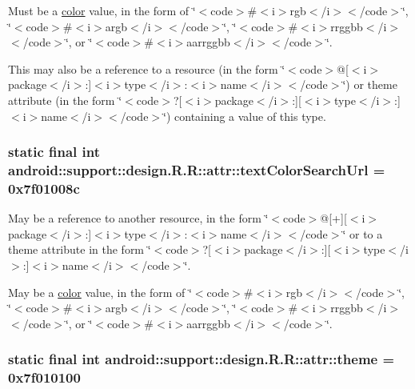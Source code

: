 Must be a \hyperlink{classandroid_1_1support_1_1design_1_1_r_1_1color}{color} value, in the form of \char`\"{}$<$code$>$\#$<$i$>$rgb$<$/i$>$$<$/code$>$\char`\"{}, \char`\"{}$<$code$>$\#$<$i$>$argb$<$/i$>$$<$/code$>$\char`\"{}, \char`\"{}$<$code$>$\#$<$i$>$rrggbb$<$/i$>$$<$/code$>$\char`\"{}, or \char`\"{}$<$code$>$\#$<$i$>$aarrggbb$<$/i$>$$<$/code$>$\char`\"{}. 

This may also be a reference to a resource (in the form \char`\"{}$<$code$>$@\mbox{[}$<$i$>$package$<$/i$>$:\mbox{]}$<$i$>$type$<$/i$>$:$<$i$>$name$<$/i$>$$<$/code$>$\char`\"{}) or theme attribute (in the form \char`\"{}$<$code$>$?\mbox{[}$<$i$>$package$<$/i$>$:\mbox{]}\mbox{[}$<$i$>$type$<$/i$>$:\mbox{]}$<$i$>$name$<$/i$>$$<$/code$>$\char`\"{}) containing a value of this type. \hypertarget{classandroid_1_1support_1_1design_1_1_r_1_1attr_c075dcd0349f5fa189e8b23ac0cbfe4b}{
\subsubsection[{textColorSearchUrl}]{\setlength{\rightskip}{0pt plus 5cm}static final int android::support::design.R.R::attr::textColorSearchUrl = 0x7f01008c}}
\label{classandroid_1_1support_1_1design_1_1_r_1_1attr_c075dcd0349f5fa189e8b23ac0cbfe4b}


May be a reference to another resource, in the form \char`\"{}$<$code$>$@\mbox{[}+\mbox{]}\mbox{[}$<$i$>$package$<$/i$>$:\mbox{]}$<$i$>$type$<$/i$>$:$<$i$>$name$<$/i$>$$<$/code$>$\char`\"{} or to a theme attribute in the form \char`\"{}$<$code$>$?\mbox{[}$<$i$>$package$<$/i$>$:\mbox{]}\mbox{[}$<$i$>$type$<$/i$>$:\mbox{]}$<$i$>$name$<$/i$>$$<$/code$>$\char`\"{}. 

May be a \hyperlink{classandroid_1_1support_1_1design_1_1_r_1_1color}{color} value, in the form of \char`\"{}$<$code$>$\#$<$i$>$rgb$<$/i$>$$<$/code$>$\char`\"{}, \char`\"{}$<$code$>$\#$<$i$>$argb$<$/i$>$$<$/code$>$\char`\"{}, \char`\"{}$<$code$>$\#$<$i$>$rrggbb$<$/i$>$$<$/code$>$\char`\"{}, or \char`\"{}$<$code$>$\#$<$i$>$aarrggbb$<$/i$>$$<$/code$>$\char`\"{}. \hypertarget{classandroid_1_1support_1_1design_1_1_r_1_1attr_e8c8b9d2c5602763ec422d6c688d3d53}{
\subsubsection[{theme}]{\setlength{\rightskip}{0pt plus 5cm}static final int android::support::design.R.R::attr::theme = 0x7f010100}}
\label{classandroid_1_1support_1_1design_1_1_r_1_1attr_e8c8b9d2c5602763ec422d6c688d3d53}


